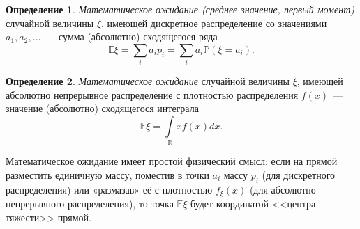 \documentclass[oneside,final,14pt]{extreport}
\theoremstyle{plain}
\theoremstyle{definition}
\newtheorem*{defn}{Определение}
\theoremstyle{named}
\begin{document}
\begin{defn}
    {\it Математическое ожидание (среднее значение, первый момент)} случайной величины $\xi$, имеющей дискретное распределение со значениями $a_1, a_2, \ldots$~--- сумма (абсолютно) сходящегося ряда
    \begin{equation*}
        \mathbb{E} \xi=\sum\limits_{i} a_{i} p_{i}=\sum\limits_{i} a_{i} \mathbb{P}\left(\xi=a_{i}\right).
    \end{equation*}
\end{defn}

\begin{defn}
    {\it Математическое ожидание} случайной величины $\xi$, имеющей абсолютно непрерывное распределение с плотностью распределения $f(x)$~--- значение (абсолютно) сходящегося интеграла
    \begin{equation*}
        \mathbb{E} \xi=\int\limits_{\mathbb{R}} x f(x) dx.
    \end{equation*}
\end{defn}

Математическое ожидание имеет простой физический смысл: если на прямой разместить единичную массу, поместив в точки $a_i$ массу $p_i$ (для дискретного распределения) или «размазав» её с плотностью $f_\xi(x)$ (для абсолютно непрерывного распределения), то точка $\mathbb{E}\xi$ будет координатой <<центра тяжести>> прямой.
\end{document}
